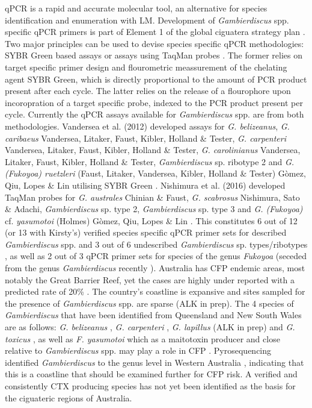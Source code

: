 \documentclass[12pt]{article}
\begin{document}
qPCR is a rapid and accurate molecular tool, an alternative for species identification and enumeration with LM. Development of \emph{Gambierdiscus} spp. specific qPCR primers is part of Element 1 of the global ciguatera strategy plan \citep{globalcig}. Two major principles can be used to devise species specific qPCR methodologies: SYBR Green based assays or assays using TaqMan probes \citep{smith2009advantages}. The former relies on target specific primer design and flourometric meassurement of the chelating agent SYBR Green, which is directly proportional to the amount of PCR product present after each cycle. The latter relies on the release of a flourophore upon incoropration of a target specific probe, indexed to the PCR product present per cycle. Currently the qPCR assays available for \emph{Gambierdiscus} spp. are from both methodologies. Vandersea et al. (2012) developed assays for \emph{G. belizeanus}, \emph{G. caribaeus} Vandersea, Litaker, Faust, Kibler, Holland \& Tester, \emph{G. carpenteri} Vandersea, Litaker, Faust, Kibler, Holland \& Tester, \emph{G. carolinianus} Vandersea, Litaker, Faust, Kibler, Holland \& Tester, \emph{Gambierdiscus} sp. ribotype 2 and \emph{G. (Fukoyoa) ruetzleri} (Faust, Litaker, Vandersea, Kibler, Holland \& Tester) G\`omez, Qiu, Lopes \& Lin utilising SYBR Green \citep{vandersea2012development}. Nishimura et al. (2016) developed TaqMan probes for \emph{G. australes} Chinian \& Faust, \emph{G. scabrosus} Nishimura, Sato \& Adachi, \emph{Gambierdiscus} sp. type 2, \emph{Gambierdiscus} sp. type 3 and \emph{G. (Fukoyoa)} cf. \emph{yasumotoi} (Holmes) G\`omez, Qiu, Lopes \& Lin \citep{nishimura2016quantitative}. This constitutes 6 out of 12 (or 13 with Kirsty's) verified species specific qPCR primer sets for described \emph{Gambierdiscus} spp. and 3 out of 6 undescribed \emph{Gambierdiscus} sp. types/ribotypes , as well as 2 out of 3 qPCR primer sets for species of the genus \emph{Fukoyoa} (seceded from the genus \emph{Gambierdiscus} recently \citep{gomez2015fukuyoa}).
Australia has CFP endemic areas, most notably the Great Barrier Reef, yet the cases are highly under reported with a predicted rate of 20\% \citep{lewis2006ciguatera}. The country's coastline is expansive and sites sampled for the presence of \emph{Gambierdiscus} spp. are sparse (ALK in prep). The 4 species of \emph{Gambierdiscus} that have been identified from Queensland and New South Wales are as follows: \emph{G. belizeanus} \citep{murray2014molecular}, \emph{G. carpenteri} \citep{kohli2014high}, \emph{G. lapillus} (ALK in prep) and \emph{G. toxicus} \citep{hallegraeff2010algae}, as well as \emph{F. yasumotoi} \citep{murray2014molecular} which as a maitotoxin producer and close relative to \emph{Gambierdiscus} spp. may play a role in CFP \citep{kohli2014feeding}. Pyrosequencing identified \emph{Gambierdiscus} to the genus level in Western Australia \citep{kohli2014cob} , indicating that this is a coastline that should be examined further for CFP risk. A verified and consistently CTX producing species has not yet been identified as the basis for the ciguateric regions of Australia.
\end{document}
